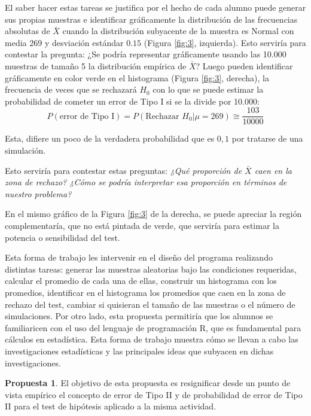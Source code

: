 \documentclass[oneside,spanish]{amsart}
\numberwithin{equation}{section}
\theoremstyle{definition}
\newtheorem{propuesta}{\bfseries Propuesta}
\begin{document}
El saber hacer estas tareas se justifica por el hecho de cada alumno puede generar sus propias muestras e identificar gráficamente la distribución de las frecuencias absolutas de $\bar{X}$ cuando la distribución subyacente de la muestra es Normal con media 269 y desviación estándar $0.15$ (Figura \ref{fig:3}, izquierda). Esto serviría para contestar la pregunta: ¿Se podría representar gráficamente usando las 10.000 muestras de tamaño 5 la distribución empírica de $\bar{X}$? Luego pueden identificar gráficamente en color verde en el histograma (Figura \ref{fig:3}, derecha), la frecuencia de veces que se rechazará $H_0$ con lo que se puede estimar la probabilidad de cometer un error de Tipo I si se la divide por 10.000:
\begin{equation*}
	P(\text{error de Tipo I}) = P(\text{Rechazar $H_0$}|\mu=269) \cong \frac{103}{10000}
\end{equation*}

Esta, difiere un poco de la verdadera probabilidad que es $0,1$ por tratarse de una simulación.

Esto serviría para contestar estas preguntas: \textit{¿Qué proporción de $\bar{X}$ caen en la zona de rechazo? ¿Cómo se podría interpretar esa proporción en términos de nuestro problema?}

En el mismo gráfico de la Figura \ref{fig:3} de la derecha, se puede apreciar la región complementaría, que no está pintada de verde, que serviría para estimar la potencia o sensibilidad del test.

Esta forma de trabajo les intervenir en el diseño del programa realizando distintas tareas: generar las muestras aleatorias bajo las condiciones requeridas, calcular el promedio de cada una de ellas, construir un histograma con los promedios, identificar en el histograma los promedios que caen en la zona de rechazo del test, cambiar si quisieran el tamaño de las muestras o el número de simulaciones. Por otro lado, esta propuesta permitiría que los alumnos se familiaricen con el uso del lenguaje de programación R, que es fundamental para cálculos en estadística. Esta forma de trabajo muestra cómo se llevan a cabo las investigaciones estadísticas y las principales ideas que subyacen en dichas investigaciones.

\begin{propuesta}\label{prop:2}
	El objetivo de esta propuesta es resignificar desde un punto de vista empírico el concepto de error de Tipo II y de probabilidad de error de Tipo II para el test de hipótesis aplicado a la misma actividad.
\end{propuesta}
\end{document}
